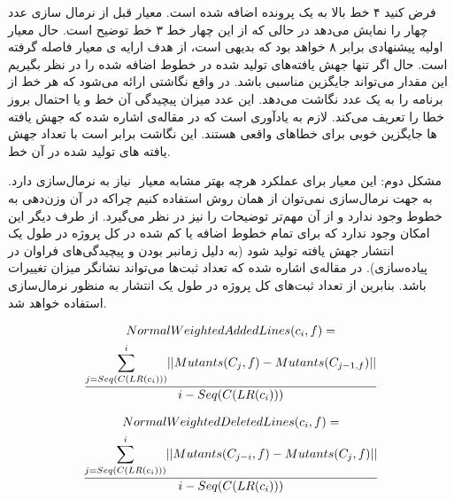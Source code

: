 فرض کنید ۴ خط بالا به یک پرونده اضافه شده است. معیار   قبل از نرمال سازی عدد چهار را نمایش می‌دهد در حالی که از این چهار خط ۳ خط توضیح است. حال معیار اولیه پیشنهادی برابر ۸ خواهد بود که بدیهی است، از هدف ارايه ی معیار فاصله گرفته است. حال اگر تنها جهش یافته‌های تولید شده در خطوط اضافه شده را در نظر بگیریم این مقدار می‌تواند جایگزین مناسبی باشد. در‌ واقع نگاشتی  ارائه می‌شود که هر خط از برنامه را به یک عدد نگاشت می‌دهد. این عدد میزان پیچیدگی آن خط و یا احتمال بروز خطا را تعریف می‌کند.  لازم به یادآوری است که در مقاله‌ی  \cite{just2014mutants} اشاره شده که جهش یافته ها جایگزین خوبی برای خطاهای واقعی هستند. این نگاشت برابر است با تعداد جهش یافته های تولید شده در آن خط.

مشکل دوم: این معیار برای عملکرد هرچه بهتر مشابه معیار  ‌ نیاز به نرمال‌سازی دارد. به جهت نرمال‌سازی نمی‌توان از همان روش استفاده کنیم چراکه در آن وزن‌دهی به خطوط وجود ندارد و از آن مهم‌تر توضیحات را نیز در نظر می‌گیرد. از طرف دیگر این امکان وجود ندارد که برای تمام خطوط اضافه یا کم شده در کل پروژه در طول یک انتشار جهش یافته تولید شود (به دلیل زمانبر بودن و پیچیدگی‌های فراوان در پیاده‌سازی). در مقاله‌ی \cite{bird2011don} اشاره شده که تعداد ثبت‌ها می‌تواند نشانگر میزان تغییرات باشد. بنابرین از تعداد ثبت‌های کل پروژه در طول یک انتشار به منظور نرمال‌سازی استفاده خواهد شد.\\

\begin{latin}
\begin{multline*}
NormalWeightedAddedLines(c_i,f) =\\ \frac{ \mathlarger{\sum}\limits_{j=Seq(C(LR(c_i)))}^{i} ||Mutants(C_j,f) - Mutants(C_{j-1,f})||
	}{i - Seq(C(LR(c_i)))}\\
\end{multline*}
\end{latin}

\begin{latin}
	\begin{multline*}
	NormalWeightedDeletedLines(c_i,f) =\\ \frac{ \mathlarger{\sum}\limits_{j=Seq(C(LR(c_i)))}^{i} ||Mutants(C_{j-i},f) - Mutants(C_j,f)||
	}{i - Seq(C(LR(c_i)))}\\
	\end{multline*}
\end{latin}

